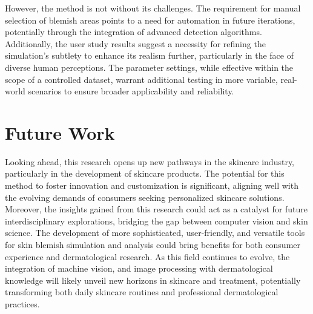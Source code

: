 \begin{spacing}{1.5}
However, the method is not without its challenges. The requirement for manual selection of blemish areas points to a need for automation in future iterations, potentially through the integration of advanced detection algorithms. Additionally, the user study results suggest a necessity for refining the simulation's subtlety to enhance its realism further, particularly in the face of diverse human perceptions. The parameter settings, while effective within the scope of a controlled dataset, warrant additional testing in more variable, real-world scenarios to ensure broader applicability and reliability.

\section{Future Work}
Looking ahead, this research opens up new pathways in the skincare industry, particularly in the development of skincare products. The potential for this method to foster innovation and customization is significant, aligning well with the evolving demands of consumers seeking personalized skincare solutions. Moreover, the insights gained from this research could act as a catalyst for future interdisciplinary explorations, bridging the gap between computer vision and skin science. The development of more sophisticated, user-friendly, and versatile tools for skin blemish simulation and analysis could bring benefits for both consumer experience and dermatological research. As this field continues to evolve, the integration of machine vision, and image processing with dermatological knowledge will likely unveil new horizons in skincare and treatment, potentially transforming both daily skincare routines and professional dermatological practices.

\end{spacing}
    
\newpage
